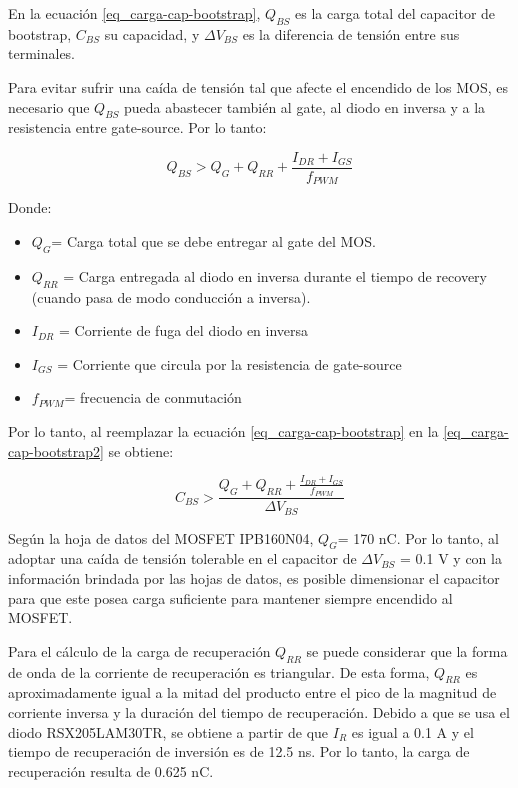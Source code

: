 \noindent En la ecuación \ref{eq_carga-cap-bootstrap}, $Q_{BS}$ es la carga total del capacitor de bootstrap, $C_{BS}$ su capacidad, y $\Delta V_{BS}$ es la diferencia de  tensión entre sus terminales. 

\noindent Para evitar sufrir una caída de tensión tal que afecte el encendido de los MOS, es necesario que $Q_{BS}$ pueda abastecer también al gate, al diodo en inversa y a la resistencia entre gate-source. Por lo tanto:

\begin{equation} \label{eq_carga-cap-bootstrap2}
Q_{BS} > Q_G + Q_{RR} + \frac{I_{DR}+I_{GS}}{f_{PWM}}
\end{equation}

\noindent Donde:
\begin{itemize}
\item $Q_G$= Carga total que se debe entregar al gate del MOS.
\item $Q_{RR}$ = Carga entregada al diodo en inversa durante el tiempo de recovery (cuando pasa de modo conducción a inversa).
\item $I_{DR}$ = Corriente de fuga del diodo en inversa
\item $I_{GS}$ = Corriente que circula por la resistencia de gate-source
\item $f_{PWM}$= frecuencia de conmutación
\end{itemize}


\noindent Por lo tanto, al reemplazar la ecuación \ref{eq_carga-cap-bootstrap} en la \ref{eq_carga-cap-bootstrap2} se obtiene:


\begin{equation} \label{eq_cap-bootstrap}
C_{BS} > \frac{Q_G+Q_{RR} + \frac{I_{DR}+I_{GS}}{f_{PWM}}}{\Delta V_{BS}}
\end{equation}

\noindent Según la hoja de datos \cite{IPB160N04} del MOSFET IPB160N04, $Q_G$= 170 nC. Por lo tanto, al adoptar una caída de tensión tolerable en el capacitor de $\Delta V_{BS}$ = 0.1 V y con la información brindada por las hojas de datos, es posible dimensionar el capacitor para que este posea carga suficiente para mantener siempre encendido al MOSFET.

\noindent Para el cálculo de la carga de recuperación $Q_{RR}$ se puede considerar que la forma de onda de la corriente de recuperación es triangular. De esta forma,  $Q_{RR}$ es aproximadamente igual a la mitad del producto entre el pico de la magnitud de corriente inversa y la duración del tiempo de recuperación.  Debido a que se usa el diodo RSX205LAM30TR, se obtiene a partir de \cite{RSX205LAM30} que  $I_R$ es igual a 0.1 A  y  el tiempo de recuperación de inversión es de 12.5 ns. Por lo tanto, la carga de recuperación resulta de 0.625 nC.

